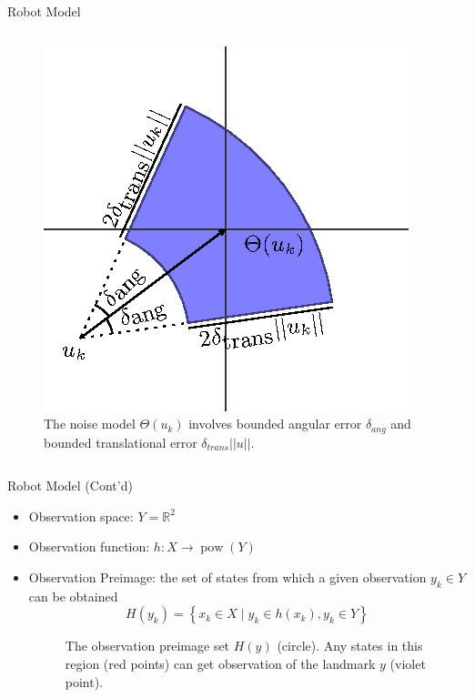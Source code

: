 \documentclass[10pt]{beamer}
\newcommand{\pow}{\operatorname{pow}}
\begin{document}
\begin{frame}{Robot Model}
\begin{itemize}
\begin{columns}
\begin{column}{0.5\textwidth}
\begin{figure}
            \centering
            \includegraphics[scale=0.55]{figs/noisemodel}
            \caption{\scriptsize{The noise model $\Theta(u_k)$ involves bounded
                angular error $\delta_{ang}$ and bounded translational error
                $\delta_{trans}||u||$.}}
            \label{fig:noiseModel}
          \end{figure}
        \end{column}
    \end{columns}
\end{itemize}
  	
\end{frame}

\begin{frame}{Robot Model (Cont'd)}
  \begin{itemize}
  \item Observation space: $Y = \mathbb{R}^2$
  \item Observation function: $h : X \to \pow(Y) $
  \item Observation Preimage: the set of states from which a given observation
    $y_k \in Y$ can be obtained
  \begin{equation}
    H(y_k) = \left\{ x_k \in X \mid y_k \in h(x_k), y_k \in Y \right\}
  \end{equation}
 
  \begin{figure}
    \centering
  \caption{\scriptsize{The observation preimage set $H(y)$ (circle). Any states in this
    region (red points) can get observation of the landmark $y$ (violet
    point).}}
\end{figure}
\end{itemize}
\end{frame}
\end{document}
